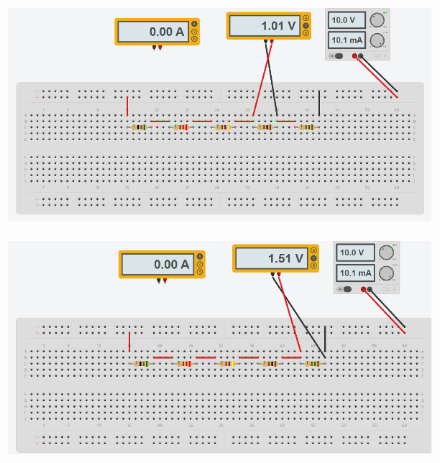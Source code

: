 \begin{figure}[H]
\begin{minipage}{0.45\textwidth}
      \label{fig: Simulacion Conexion Serie A2}
    \end{minipage}
    \hfill
    \begin{minipage}{0.45\textwidth}
      \centering
      \includegraphics[width=\textwidth]{Figures/1. Content/simulation/serieV1.png}
      \label{fig: Simulacion Conexion Serie V1}
    \end{minipage}
    \hfill
    \begin{minipage}{0.45\textwidth}
      \centering
      \includegraphics[width=\textwidth]{Figures/1. Content/simulation/serieV2.png}
      \label{fig: Simulacion Conexion Serie V2}
    \end{minipage}
\end{figure}

